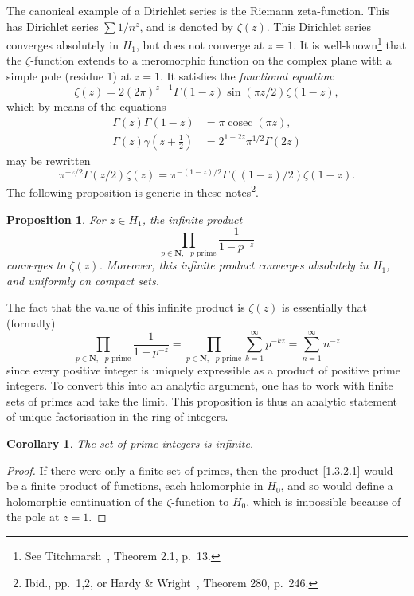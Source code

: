 \documentclass[10pt]{article}
\newtheorem{prop}[theo]{Proposition}
\newtheorem{coro}[theo]{Corollary}
\theoremstyle{definition}
\def\NN{\mathbf{N}}
\def\fnei{See Titchmarsh~\cite{bib:195}, Theorem 2.1, p.~13.}
\def\fnni{Ibid., pp.~1,2, or Hardy \& Wright~\cite{bib:86}, Theorem 280, p.~246.}
\begin{document}
The canonical example of a Dirichlet series is the Riemann zeta-function.
This has Dirichlet series $\sum 1/n^z$, and is denoted by $\zeta(z)$.
This Dirichlet series converges absolutely in $H_1$, but does not converge at $z = 1$.
It is well-known\footnote{\fnei} that the $\zeta$-function extends to a meromorphic function on the complex plane with a simple pole (residue 1) at $z = 1$.
It satisfies the \emph{functional equation}:
\begin{equation}
\label{1.3.1}
\zeta(z) = 2 (2\pi)^{z-1} \Gamma(1-z) \sin(\pi z/2) \zeta(1-z),
\end{equation}
which by means of the equations
\begin{align*}
\Gamma(z) \Gamma(1-z)
&= \pi \operatorname{cosec} (\pi z),
\\
\Gamma(z) \gamma(z + \tfrac 12) 
&= 2^{1-2z} \pi^{1/2} \Gamma(2z)
\end{align*}
may be rewritten
\[
\pi^{-z/2} \Gamma(z/2) \zeta(z)
= \pi^{-(1-z)/2} \Gamma((1-z)/2) \zeta(1-z).
\]
The following proposition is generic in these notes\footnote{\fnni}.


\begin{prop}
\label{1.3.2}
For $z \in H_1$, the infinite product
\begin{equation}
\label{1.3.2.1}
\prod_{p \in \NN,\text{ $p$ prime}}
\frac{1}{1-p^{-z}}
\end{equation}
converges to $\zeta(z)$.
Moreover, this infinite product converges absolutely in $H_1$, and uniformly on compact sets.
\end{prop}

The fact that the value of this infinite product is $\zeta(z)$ is essentially that (formally)
\[
\prod_{p \in \NN,\text{ $p$ prime}}
\frac{1}{1-p^{-z}}
= \prod_{p \in \NN,\text{ $p$ prime}}
\sum_{k=1}^\infty p^{-kz}
= \sum_{n=1}^\infty n^{-z}
\]
since every positive integer is uniquely expressible as a product of positive prime integers.
To convert this into an analytic argument, one has to work with finite sets of primes and take the limit.
This proposition is thus an analytic statement of unique factorisation in the ring of integers.


\begin{coro}
\label{1.3.3}
The set of prime integers is infinite.
\end{coro}

\begin{proof}
If there were only a finite set of primes, then the product \eqref{1.3.2.1} would be a finite product of functions, each holomorphic in $H_0$, and so would define a holomorphic continuation of the $\zeta$-function to $H_0$, which is impossible because of the pole at $z = 1$.
\end{proof}
\end{document}
